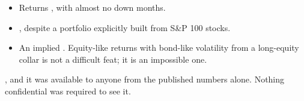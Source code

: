 \begin{itemize}
\item Returns , with almost no down months.
\item {}, despite a portfolio
explicitly built from S\&P 100 stocks.
\item An implied . Equity-like returns with bond-like volatility from a long-equity
collar is not a difficult feat; it is an impossible one.
\end{itemize}

\begin{imkeybox}
, and it was available to anyone from the published numbers alone.
Nothing confidential was required to see it.
\end{imkeybox}


